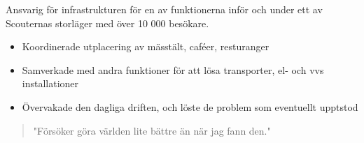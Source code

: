 \documentclass[10pt,a4paper,ragged2e,withhyper]{altacv}
\begin{document}
\begin{paracol}{2}
Ansvarig för infrastrukturen för en av funktionerna inför och under ett av Scouternas storläger med över 10 000 besökare.\smallskip
\begin{itemize}
\item Koordinerade utplacering av mässtält, caféer, resturanger
\item Samverkade med andra funktioner för att lösa transporter, el- och vvs installationer
\item Övervakade den dagliga driften, och löste de problem som eventuellt upptstod
\end{itemize}
\switchcolumn


\begin{quote}
"Försöker göra världen lite bättre än när jag fann den."
\end{quote}








\\
\\
\\
\\
\divider\smallskip

\\
\\


\divider


\end{paracol}
\end{document}

